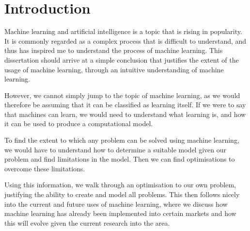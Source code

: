 
\section{Introduction}
\label{intro}

Machine learning and artificial intelligence is a topic that is rising in popularity. It is commonly regarded as a complex process that is difficult to understand, and thus has inspired me to understand the process of machine learning. This dissertation should arrive at a simple conclusion that justifies the extent of the usage of machine learning, through an intuitive understanding of machine learning. 

However, we cannot simply jump to the topic of machine learning, as we would therefore be assuming that it can be classified as learning itself. If we were to say that machines can learn, we would need to understand what learning is, and how it can be used to produce a computational \gls{model}. 

To find the extent to which any problem can be solved using machine learning, we would have to understand how to determine a suitable model given our problem and find limitations in the \gls{model}. Then we can find optimisations to overcome these limitations.

Using this information, we walk through an optimisation to our own problem, justifying the ability to create and model all problems. This then follows nicely into the current and future uses of machine learning, where we discuss how machine learning has already been implemented into certain markets and how this will evolve given the current research into the area.